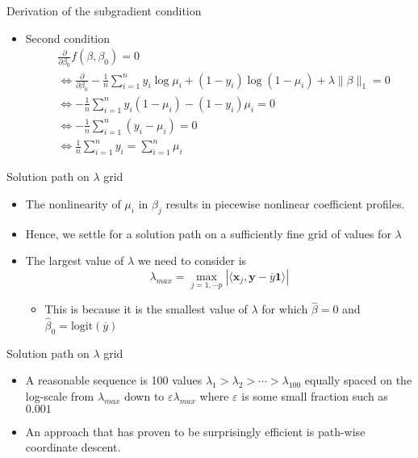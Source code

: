 \documentclass[11pt]{beamer}
\begin{document}
\begin{frame}{Derivation of the subgradient condition}
    \begin{itemize}
        \item Second condition
        \begin{align*}
            &\frac{\partial}{\partial \beta_0}f(\beta, \beta_0)=0 \\
            &\Leftrightarrow \frac{\partial}{\partial \beta_0} -\frac 1 n \sum_{i=1}^n y_i\log \mu_i +(1-y_i)\log(1-\mu_i)+\lambda \|\beta\|_1 =0 \\ 
            &\Leftrightarrow -\frac 1n \sum_{i=1}^n y_i(1-\mu_i) - (1-y_i)\mu_i   =0\\
            &\Leftrightarrow  -\frac 1n \sum_{i=1}^n (y_i-\mu_i) =0\\
            &\Leftrightarrow \frac 1n \sum_{i=1}^n y_i=\sum_{i=1}^n \mu_i
        \end{align*}
    \end{itemize}
\end{frame}

\begin{frame}{Solution path on $\lambda$ grid}
    \begin{itemize}
        \item The nonlinearity of $\mu_i$ in $\beta_j$ results in piecewise nonlinear coefficient profiles.
        \item Hence, we settle for a solution path on a sufficiently fine grid of values for $\lambda$
        \item The largest value of $\lambda$ we need to consider is $$\lambda_{max}= \max_{j=1, \cdots p} |\langle \mathbf{x}_j, \mathbf{y}-\overline{y}\mathbf{1}\rangle|$$
        \begin{itemize}
            \item This is because it is the smallest value of $\lambda$ for which $\hat\beta=0$ and $\hat\beta_0=\text{logit}(\overline{y})$
        \end{itemize}
    \end{itemize}
\end{frame}

\begin{frame}{Solution path on $\lambda$ grid}
    \begin{itemize}
        \item A reasonable sequence is 100 values $\lambda_1>\lambda_2>\cdots >\lambda_{100}$ equally spaced on the log-scale from $\lambda_{max}$ down to $\varepsilon \lambda_{max}$ where $\varepsilon$ is some small fraction such as $0.001$
        \item An approach that has proven to be surprisingly efficient is path-wise coordinate descent.
    \end{itemize}
\end{frame}
\end{document}
